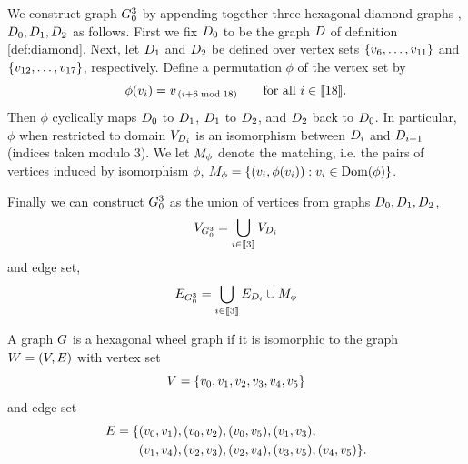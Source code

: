 We construct graph $G_0^3$ by appending together three hexagonal diamond graphs , $D_0, D_1, D_2$ as follows. First we fix $D_0$ to be the graph $D$ of definition \ref{def:diamond}. %
Next, let $D_1$ and $D_2$ be defined over vertex sets 
$\{v_6,\dots,v_{11}\}$ and $\{v_{12},\dots,v_{17}\}$, respectively.
Define a permutation $\phi$ of the vertex set by
\[
\phi(v_i) = v_{\, (i+6 \bmod 18)} \qquad \text{for all } i \in \llbracket 18 \rrbracket.
\]
Then $\phi$ cyclically maps $D_0$ to $D_1$, 
$D_1$ to $D_2$, and $D_2$ back to $D_0$.
In particular, $\phi$ when restricted to domain $V_{D_i}$ is an isomorphism between $D_i$ and $D_{i+1}$ (indices taken modulo $3$). We let $M_\phi$ denote the matching, i.e. the pairs of vertices induced by isomorphism $\phi$,  $M_\phi = \{(v_i,\phi(v_i)) : v_i \in \mathrm{Dom}(\phi)\}$. 

Finally we can construct $G_0^3$ as the union of vertices from graphs $D_0, D_1, D_2$, 
$$V_{G_0^3} = \bigcup_{i \in \llbracket 3 \rrbracket} V_{D_i}$$
and edge set, 
$$E_{G_0^3} = \bigcup_{i \in \llbracket 3 \rrbracket} E_{D_i}  \cup M_\phi$$

\begin{definition}\label{def:wheel}
    A graph $G$ is a hexagonal wheel graph if it is isomorphic to the graph
    $W = (V,E)$ with vertex set
    \[
        V = \{v_0,v_1,v_2,v_3,v_4,v_5\}
    \]
    and edge set
    \[
    \begin{aligned}
        E = \{&(v_0,v_1), (v_0,v_2), (v_0,v_5), (v_1,v_3),\\
                    &(v_1,v_4), (v_2,v_3), (v_2,v_4), (v_3,v_5), (v_4,v_5)\}.
    \end{aligned}
    \]
\end{definition}

